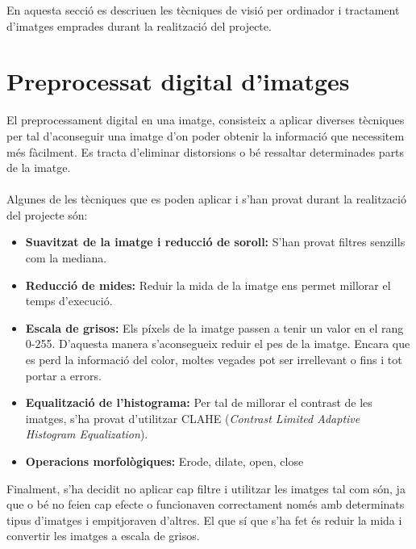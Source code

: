 En aquesta secció es descriuen les tècniques de visió per ordinador i tractament d'imatges emprades durant la realització del projecte.

\section{Preprocessat digital d'imatges}
	El preprocessament digital en una imatge, consisteix a aplicar diverses tècniques per tal d'aconseguir una imatge d'on poder obtenir la informació que necessitem més fàcilment. Es tracta
	d'eliminar distorsions o bé ressaltar determinades parts de la imatge.\\\\
	Algunes de les tècniques que es poden aplicar i s'han provat durant la realització del projecte són:

	\begin{itemize}
		\item{\textbf{Suavitzat de la imatge i reducció de soroll:} S'han provat filtres senzills com la mediana.}
		\item{\textbf{Reducció de mides:} Reduir la mida de la imatge ens permet millorar el temps d'execució.}
		\item{\textbf{Escala de grisos:} Els píxels de la imatge passen a tenir un valor en el rang 0-255. D'aquesta manera s'aconsegueix reduir el pes de la imatge. Encara que es perd la informació del color, moltes
		vegades pot ser irrellevant o fins i tot portar a errors.}
		\item{\textbf{Equalització de l'histograma:} Per tal de millorar el contrast de les imatges, s'ha provat d'utilitzar CLAHE (\textit{Contrast Limited Adaptive Histogram Equalization}).}
		\item{\textbf{Operacions morfològiques:} Erode, dilate, open, close}
	\end{itemize}
\noindent
	Finalment, s'ha decidit no aplicar cap filtre i utilitzar les imatges tal com són, ja que o bé no feien cap efecte o funcionaven correctament només amb determinats tipus d'imatges i empitjoraven d'altres.
	El que sí que s'ha fet és reduir la mida i convertir les imatges a escala de grisos.

\newpage
